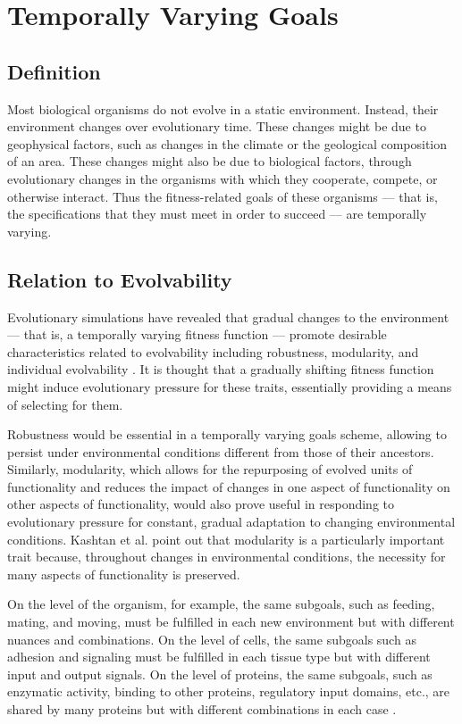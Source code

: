 \section{Temporally Varying Goals} \label{sec:tvg}
\subsection{Definition}
Most biological organisms do not evolve in a static environment. Instead, their environment changes over evolutionary time. These changes might be due to geophysical factors, such as changes in the climate or the geological composition of an area. These changes might also be due to biological factors, through evolutionary changes in the organisms with which they cooperate, compete, or otherwise interact. Thus the fitness-related goals of these organisms --- that is, the specifications that they must meet in order to succeed --- are temporally varying.

\subsection{Relation to Evolvability}

Evolutionary simulations have revealed that gradual changes to the environment  --- that is, a temporally varying fitness function --- promote desirable characteristics related to evolvability including robustness, modularity, and individual evolvability \cite{Kashtan2007VaryingEvolution, Wilder2015ReconcilingEvolvability}. It is thought that a gradually shifting fitness function might induce evolutionary pressure for these traits, essentially providing a means of selecting for them. 

Robustness would be essential in a temporally varying goals scheme, allowing to persist under environmental conditions different from those of their ancestors. Similarly, modularity, which allows for the repurposing of evolved units of functionality and reduces the impact of changes in one aspect of functionality on other aspects of functionality, would also prove useful in responding to evolutionary pressure for constant, gradual adaptation to changing environmental conditions. Kashtan et al. point out that modularity is a particularly important trait because, throughout changes in environmental conditions, the necessity for many aspects of functionality is preserved.

\begin{displayquote}
On the level of the organism, for example, the same subgoals, such as feeding, mating, and moving, must be fulfilled in each new environment but with different nuances and combinations. On the level of cells, the same subgoals such as adhesion and signaling must be fulfilled in each tissue type but with different input and output signals. On the level of proteins, the same subgoals, such as enzymatic activity, binding to other proteins, regulatory input domains, etc., are shared by many proteins but with different combinations in each case \cite{Kashtan2007VaryingEvolution}.
\end{displayquote}

